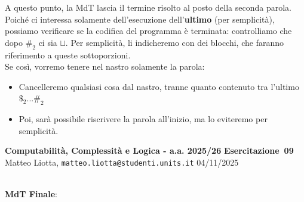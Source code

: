 \documentclass[a4paper,10pt]{article}
\makeatletter
\newcommand{\EsercitazioneNum}{09}
\newcommand{\Data}{04/11/2025}
\newcommand{\DocType}{Esercitazione} %
\newcommand{\FullTitle}{\DocType\ \EsercitazioneNum}
\newcommand{\Header}{
\noindent
  \small \textbf{Computabilità, Complessità e Logica - a.a. 2025/26} \hfill \textbf{\FullTitle} \\[0.2cm]
  \scriptsize Matteo Liotta, \texttt{matteo.liotta@studenti.units.it} \hfill \Data \\[0.2cm]
  \noindent\makebox[\linewidth]{\rule{\linewidth}{0.4pt}} \\[0.3cm]}
\newcommand{\NewPageHeader}{
  \vfill
  \noindent\makebox[\linewidth]{\rule{\linewidth}{0.4pt}}
  \newpage
  {\Header}
}
\makeatother
\begin{document}
{\begin{osservazioni}
{\begin{center}
        \end{center}}


A questo punto, la MdT lascia il termine risolto al posto della seconda parola. Poiché ci interessa solamente dell'esecuzione dell'\textbf{ultimo} (per semplicità), possiamo verificare se la codifica del programma è terminata: controlliamo che dopo $\#_2$ ci sia $\sqcup$.
Per semplicità, li indicheremo con dei blocchi, che faranno riferimento a queste sottoporzioni.\\

Se così, vorremo tenere nel nastro solamente la parola: 
\begin{itemize}
    \item Cancelleremo qualsiasi cosa dal nastro, tranne quanto contenuto tra l'ultimo $\$_2...\#_2$
    \item Poi, sarà possibile riscrivere la parola all'inizio, ma lo eviteremo per semplicità.
\end{itemize}

\end{osservazioni}
\NewPageHeader
\begin{osservazioni}
\textbf{MdT Finale}:
\\
    {

    \small
    \begin{center}
\end{center}}
\end{osservazioni}}
\end{document}
